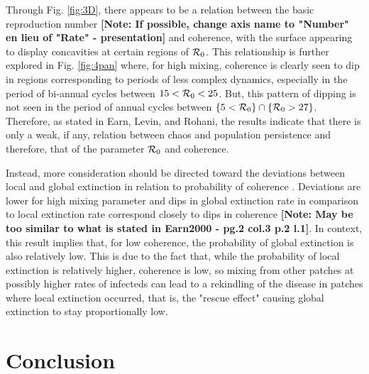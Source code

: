 \documentclass[twocolumn,nofootinbib,showkeys,twoside,floatfix,unsortedaddress,flushbottom,10pt,aps,pra]{report}
\begin{document}
Through Fig. \ref{fig:3D}, there appears to be a relation between the basic reproduction number \textbf{[Note: If possible, change axis name to "Number" en lieu of "Rate" - presentation]} and coherence, with the surface appearing to display concavities at certain regions of ${\cal R}_0$. This relationship is further explored in Fig. \ref{fig:4pan} where, for high mixing, coherence is clearly seen to dip in regions corresponding to periods of less complex dynamics, especially in the period of bi-annual cycles between $15<{\cal R}_0<25$. But, this pattern of dipping is not seen in the period of annual cycles between $\{5<{\cal R}_0\}\cap\{{\cal R}_0>27\}$. Therefore, as stated in Earn, Levin, and Rohani, the results indicate that there is only a weak, if any, relation between chaos and population persistence\cite{Earn2000} and therefore, that of the parameter ${\cal R}_0$ and coherence. \par \smallskip \qquad
Instead, more consideration should be directed toward the deviations between local and global extinction in relation to probability of coherence \cite{Earn2000,Heino1997}. Deviations are lower for high mixing parameter and dips in global extinction rate in comparison to local extinction rate correspond closely to dips in coherence \textbf{[Note: May be too similar to what is stated in Earn2000 - pg.2 col.3 p.2 l.1]}. In context, this result implies that, for low coherence, the probability of global extinction is also relatively low. This is due to the fact that, while the probability of local extinction is relatively higher, coherence is low, so mixing from other patches at possibly higher rates of infecteds can lead to a rekindling of the disease in patches where local extinction occurred, that is, the "rescue effect" causing global extinction to stay proportionally low.
\section{Conclusion} 


\onecolumn
{}%

 
\end{document}
